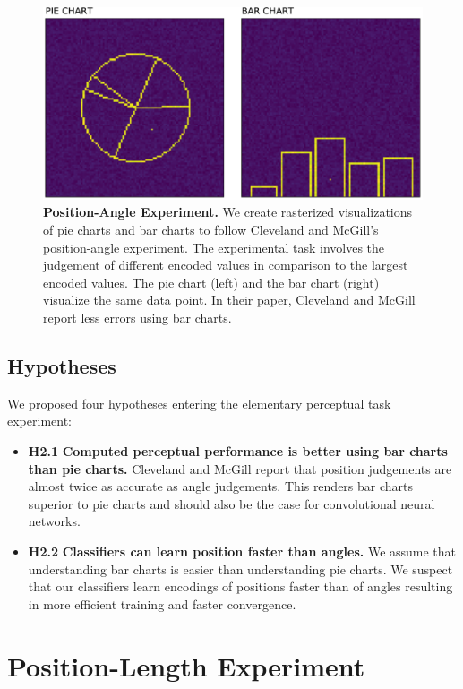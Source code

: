\documentclass[journal]{vgtc}                %
\begin{document}
\begin{figure}[t]
	  \includegraphics[width=\linewidth]{figure3_overview}
  \caption{\textbf{Position-Angle Experiment.} We create rasterized visualizations of pie charts and bar charts to follow Cleveland and McGill's position-angle experiment. The experimental task involves the judgement of different encoded values in comparison to the largest encoded values. The pie chart (left) and the bar chart (right) visualize the same data point. In their paper, Cleveland and McGill report less errors using bar charts.}
	\label{fig:position_angle_experiment}
\end{figure}

\subsection{Hypotheses}

We proposed four hypotheses entering the elementary perceptual task experiment:

\begin{itemize}
	\item \textbf{H2.1} \textbf{Computed perceptual performance is better using bar charts than pie charts.} Cleveland and McGill report that position judgements are almost twice as accurate as angle judgements. This renders bar charts superior to pie charts and should also be the case for convolutional neural networks.
	\item \textbf{H2.2} \textbf{Classifiers can learn position faster than angles.} We assume that understanding bar charts is easier than understanding pie charts. We suspect that our classifiers learn encodings of positions faster than of angles resulting in more efficient training and faster convergence.
\end{itemize}


\section{Position-Length Experiment}
\end{document}
